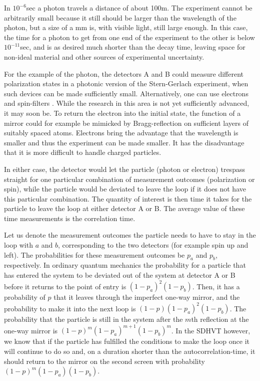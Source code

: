 \documentclass{svjour2}                    %
\begin{document}
In $10^{-6}$sec a photon travels a distance of about 100m. The
experiment cannot be arbitrarily small because it still should
be larger than the
wavelength of the photon, but a size of a mm is, with visible light, still large
enough. In this case, the time for a photon to get from one end of
the experiment to the other is below $10^{-11}$sec, and 
is as desired much shorter than the decay time, leaving space for
non-ideal material and other sources of experimental uncertainty. 

For the example of the 
photon, the detectors A and B could measure different polarization states in a photonic 
version of the Stern-Gerlach experiment, when such devices can
be made sufficiently small. Alternatively, one can use electrons and
spin-filters \cite{spinfilter}. While 
the research in this area is not yet sufficiently advanced, it may
soon be. To return the electron into
the initial state, the function of a mirror could
for example be mimicked by Bragg-reflection on sufficient layers of suitably 
spaced atoms. 
Electrons bring the advantage that the
wavelength is smaller and thus the experiment can be made smaller. It has
the disadvantage that it is more difficult to handle charged particles. 

In either case, the detector would let the particle (photon or electron)
trespass straight for one particular combination of measurement outcomes 
(polarization or spin), while the particle would be deviated to
leave the loop if it does not have this particular combination. The quantity
of interest is then time it takes for the particle to leave the loop at
either detector A or B. The average value of these time measurements is 
the correlation time.

Let us
denote the measurement outcomes the particle needs to have to stay
in the loop with $a$ and $b$, corresponding to the two detectors (for
example spin up and left).
The probabilities for these measurement outcomes be $p_a$ and $p_b$,
respectively.
In ordinary quantum mechanics the probability for a particle that 
has entered the system to be deviated out of the system at detector
A or B before it
returns to the point of entry is $(1-p_a)^2 (1-p_b)$. Then, it has a 
probability of $p$ that it leaves through the imperfect one-way mirror, and 
the probability to make it into the next loop is $(1-p)(1-p_a)^2(1-p_b)$. 
The probability that the particle is still in the system after the $m$th 
reflection at the one-way mirror is $(1-p)^{m} (1-p_a)^{m+1} (1-p_b)^m$. 
In the {\sc SDHVT} however, we know that if the particle has fulfilled the
conditions to make the loop once it will continue to do so and, on a duration shorter than
the autocorrelation-time, it should return to the mirror on the
second screen with probability $(1-p)^m (1-p_a) (1-p_b)$. 
\end{document}
